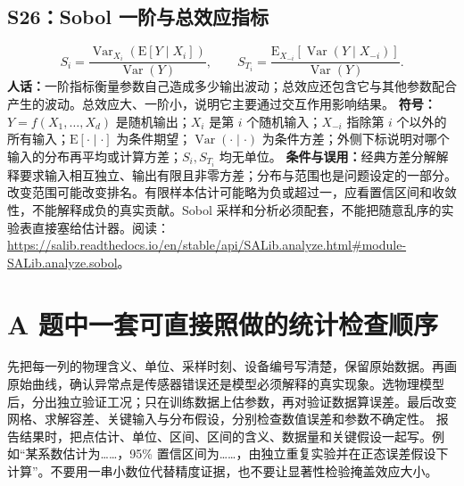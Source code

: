 \subsection{S26：Sobol 一阶与总效应指标}
\begin{equation}
 S_i=\frac{\operatorname{Var}_{X_i}(\mathrm E[Y\mid X_i])}{\operatorname{Var}(Y)},\qquad
 S_{T_i}=\frac{\mathrm E_{X_{-i}}[\operatorname{Var}(Y\mid X_{-i})]}{\operatorname{Var}(Y)}.
\end{equation}
\textbf{人话：}一阶指标衡量参数自己造成多少输出波动；总效应还包含它与其他参数配合产生的波动。总效应大、一阶小，说明它主要通过交互作用影响结果。
\textbf{符号：}$Y=f(X_1,\ldots,X_d)$ 是随机输出；$X_i$ 是第 $i$ 个随机输入；$X_{-i}$ 指除第 $i$ 个以外的所有输入；$\mathrm E[\cdot\mid\cdot]$ 为条件期望；$\operatorname{Var}(\cdot\mid\cdot)$ 为条件方差；外侧下标说明对哪个输入的分布再平均或计算方差；$S_i,S_{T_i}$ 均无单位。
\textbf{条件与误用：}经典方差分解解释要求输入相互独立、输出有限且非零方差；分布与范围也是问题设定的一部分。改变范围可能改变排名。有限样本估计可能略为负或超过一，应看置信区间和收敛性，不能解释成负的真实贡献。Sobol 采样和分析必须配套，不能把随意乱序的实验表直接塞给估计器。阅读：\url{https://salib.readthedocs.io/en/stable/api/SALib.analyze.html#module-SALib.analyze.sobol}。

\section{A 题中一套可直接照做的统计检查顺序}
先把每一列的物理含义、单位、采样时刻、设备编号写清楚，保留原始数据。再画原始曲线，确认异常点是传感器错误还是模型必须解释的真实现象。选物理模型后，分出独立验证工况；只在训练数据上估参数，再对验证数据算误差。最后改变网格、求解容差、关键输入与分布假设，分别检查数值误差和参数不确定性。
报告结果时，把点估计、单位、区间、区间的含义、数据量和关键假设一起写。例如“某系数估计为……，95\% 置信区间为……，由独立重复实验并在正态误差假设下计算”。不要用一串小数位代替精度证据，也不要让显著性检验掩盖效应大小。

